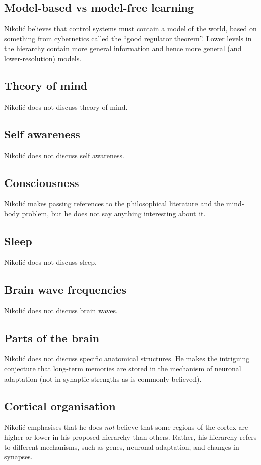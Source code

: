 \documentclass[10pt,a4paper]{article}
\newcommand{\nquote}[1]{``{#1}''}
\begin{document}
\subsection{Model-based vs model-free learning}
Nikoli{\'c} believes that control systems must contain a model of the world, based on something from cybernetics called the \nquote{good regulator theorem}. Lower levels in the hierarchy contain more general information and hence more general (and lower-resolution) models.

\subsection{Theory of mind}
Nikoli{\'c} does not discuss theory of mind.

\subsection{Self awareness}
Nikoli{\'c} does not discuss self awareness.

\subsection{Consciousness}
Nikoli{\'c} makes passing references to the philosophical literature and the mind-body problem, but he does not say anything interesting about it.

\subsection{Sleep}
Nikoli{\'c} does not discuss sleep.

\subsection{Brain wave frequencies}
Nikoli{\'c} does not discuss brain waves.

\subsection{Parts of the brain}
Nikoli{\'c} does not discuss specific anatomical structures. He makes the intriguing conjecture that long-term memories are stored in the mechanism of neuronal adaptation (not in synaptic strengths as is commonly believed).

\subsection{Cortical organisation}
Nikoli{\'c} emphasises that he does \emph{not} believe that some regions of the cortex are higher or lower in his proposed hierarchy than others. Rather, his hierarchy refers to different mechanisms, such as genes, neuronal adaptation, and changes in synapses.
\end{document}

